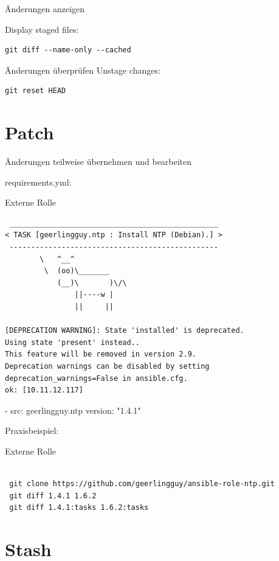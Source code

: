\begin{frame}[fragile]{Änderungen anzeigen}

Display staged files:

\begin{lstlisting}
git diff --name-only --cached
\end{lstlisting}
\end{frame}

\begin{frame}[fragile]{Änderungen überprüfen}
Unstage changes:

\begin{lstlisting}
git reset HEAD
\end{lstlisting}
\end{frame}

\section{Patch}
Änderungen teilweise übernehmen und bearbeiten

requirements.yml:

\begin{frame}[fragile]{Externe Rolle}
\begin{lstlisting}
 ________________________________________________
< TASK [geerlingguy.ntp : Install NTP (Debian).] >
 ------------------------------------------------
        \   ^__^
         \  (oo)\_______
            (__)\       )\/\
                ||----w |
                ||     ||

[DEPRECATION WARNING]: State 'installed' is deprecated.
Using state 'present' instead.. 
This feature will be removed in version 2.9. 
Deprecation warnings can be disabled by setting deprecation_warnings=False in ansible.cfg.
ok: [10.11.12.117]
\end{lstlisting}
\end{frame}

- src: geerlingguy.ntp
  version: "1.4.1"

Praxisbeispiel:

\begin{frame}[fragile]{Externe Rolle}
\begin{lstlisting}

 git clone https://github.com/geerlingguy/ansible-role-ntp.git
 git diff 1.4.1 1.6.2
 git diff 1.4.1:tasks 1.6.2:tasks

\end{lstlisting}
\end{frame}

\section{Stash}

